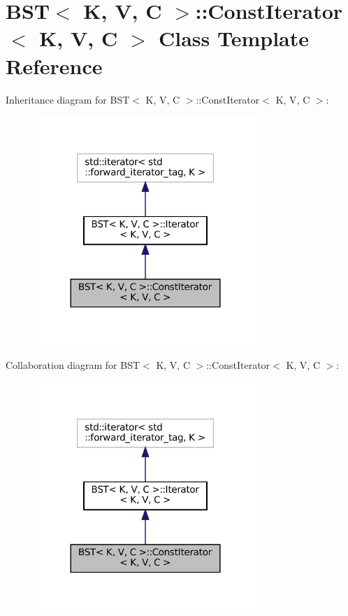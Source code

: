 \hypertarget{classBST_1_1ConstIterator}{}\section{B\+ST$<$ K, V, C $>$\+:\+:Const\+Iterator$<$ K, V, C $>$ Class Template Reference}
\label{classBST_1_1ConstIterator}


Inheritance diagram for B\+ST$<$ K, V, C $>$\+:\+:Const\+Iterator$<$ K, V, C $>$\+:
\nopagebreak
\begin{figure}[H]
\begin{center}
\leavevmode
\includegraphics[width=240pt]{classBST_1_1ConstIterator__inherit__graph}
\end{center}
\end{figure}


Collaboration diagram for B\+ST$<$ K, V, C $>$\+:\+:Const\+Iterator$<$ K, V, C $>$\+:
\nopagebreak
\begin{figure}[H]
\begin{center}
\leavevmode
\includegraphics[width=240pt]{classBST_1_1ConstIterator__coll__graph}
\end{center}
\end{figure}
